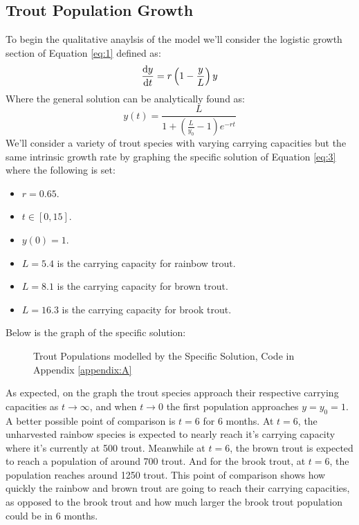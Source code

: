 \documentclass[letterpaper,12pt]{article}
\begin{document}
\subsection{Trout Population Growth}
To begin the qualitative anaylsis of the model we'll consider the logistic growth section of Equation \eqref{eq:1} defined as:
\begin{equation*}
    \dv{y}{t} = r\left(1 - \frac{y}{L}\right)y
\end{equation*}
Where the general solution can be analytically found as:
\begin{equation} \label{eq:3}
    y(t) = \frac{L}{1 + \left(\frac{L}{y_0} - 1\right)e^{-rt}}
\end{equation}
We'll consider a variety of trout species with varying carrying capacities but the same intrinsic growth rate by graphing the specific solution of Equation \eqref{eq:3} where the following is set:
\begin{itemize}
    \item \(r = 0.65\).
    \item \(t \in [0,15]\).
    \item \(y(0) = 1\).
    \item \(L = 5.4\) is the carrying capacity for rainbow trout.
    \item \(L = 8.1\) is the carrying capacity for brown trout.
    \item \(L = 16.3\) is the carrying capacity for brook trout.
\end{itemize}
Below is the graph of the specific solution:
\newline
\begin{figure}[H]
    \centering
    
    \caption{Trout Populations modelled by the Specific Solution, Code in Appendix \ref{appendix:A}}
    \label{fig:1}
\end{figure}
\noindent As expected, on the graph the trout species approach their respective carrying capacities as \(t \to \infty\), and when \(t \to 0\) the first population approaches \(y = y_0 = 1\).
A better possible point of comparison is \(t = 6\) for 6 months.
At \(t = 6\), the unharvested rainbow species is expected to nearly reach it's carrying capacity where it's currently at 500 trout.
Meanwhile at \(t = 6\), the brown trout is expected to reach a population of around 700 trout.
And for the brook trout, at \(t = 6\), the population reaches around 1250 trout.
This point of comparison shows how quickly the rainbow and brown trout are going to reach their carrying capacities, as opposed to the brook trout and how much larger the brook trout population could be in 6 months.
\end{document}
